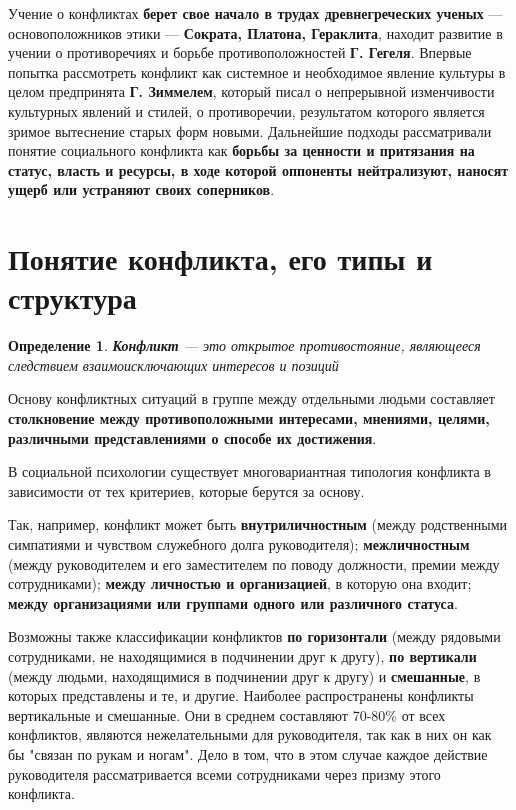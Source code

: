 \documentclass[a4paper,14pt]{extarticle}
\newtheorem{definition}{Определение}
\begin{document}
\hfill

Учение о конфликтах \textbf{берет свое начало в трудах древнегреческих ученых} — основоположников этики — \textbf{Сократа, Платона, Гераклита}, находит развитие в учении о противоречиях и борьбе противоположностей \textbf{Г. Гегеля}. Впервые попытка рассмотреть конфликт как системное и необходимое явление культуры в целом предпринята \textbf{Г. Зиммелем}, который писал о непрерывной изменчивости культурных явлений и стилей, о противоречии, результатом которого является зримое вытеснение старых форм новыми. Дальнейшие подходы рассматривали понятие социального конфликта как \textbf{борьбы за ценности и притязания на статус, власть и ресурсы, в ходе которой оппоненты нейтрализуют,
наносят ущерб или устраняют своих соперников}.

\pagebreak
\section{Понятие конфликта, его типы и структура}

\begin{definition}
\textbf{Конфликт} — это открытое противостояние, являющееся следствием взаимоисключающих интересов и позиций
\end{definition}

Основу конфликтных ситуаций в группе между отдельными людьми составляет \textbf{столкновение между противоположными интересами, мнениями, целями, различными представлениями о способе их достижения}.

В социальной психологии существует многовариантная типология конфликта в зависимости от тех критериев, которые берутся за основу.

\hfill

Так, например, конфликт может быть \textbf{внутриличностным} (между родственными симпатиями и чувством служебного долга руководителя); \textbf{межличностным} (между руководителем и его заместителем по поводу должности, премии между сотрудниками); \textbf{между личностью и организацией}, в которую она входит; \textbf{между организациями или группами одного или различного статуса}.

\hfill

Возможны также классификации конфликтов \textbf{по горизонтали} (между рядовыми сотрудниками, не находящимися в подчинении друг к другу), \textbf{по вертикали} (между людьми, находящимися в подчинении друг к другу) и \textbf{смешанные}, в которых представлены и те, и другие. Наиболее распространены конфликты вертикальные и смешанные. Они в среднем составляют 70-80\% от всех конфликтов, являются нежелательными для руководителя, так как в них он как бы "связан по рукам и ногам". Дело в том, что в этом случае каждое действие руководителя рассматривается всеми сотрудниками через призму этого конфликта.
\end{document}
